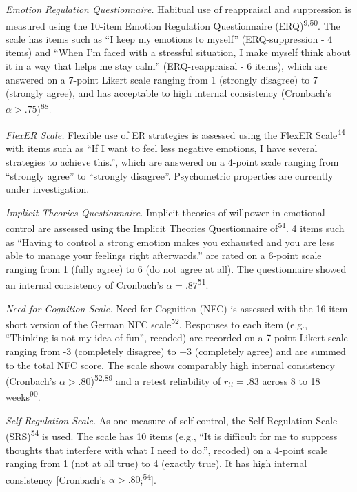 \documentclass[
  man,floatsintext]{apa6}
\begin{document}
\emph{Emotion Regulation Questionnaire.} Habitual use of reappraisal and suppression is measured using the 10-item Emotion Regulation Questionnaire (ERQ)\textsuperscript{9,50}.
The scale has items such as ``I keep my emotions to myself'' (ERQ-suppression - 4 items) and ``When I'm faced with a stressful situation, I make myself think about it in a way that helps me stay calm'' (ERQ-reappraisal - 6 items), which are answered on a 7-point Likert scale ranging from 1 (strongly disagree) to 7 (strongly agree), and has acceptable to high internal consistency (Cronbach's \(\alpha>.75\))\textsuperscript{88}.

\emph{FlexER Scale.} Flexible use of ER strategies is assessed using the FlexER Scale\textsuperscript{44} with items such as ``If I want to feel less negative emotions, I have several strategies to achieve this.'', which are answered on a 4-point scale ranging from ``strongly agree'' to ``strongly disagree''.
Psychometric properties are currently under investigation.

\emph{Implicit Theories Questionnaire.} Implicit theories of willpower in emotional control are assessed using the Implicit Theories Questionnaire of\textsuperscript{51}.
4 items such as ``Having to control a strong emotion makes you exhausted and you are less able to manage your feelings right afterwards.'' are rated on a 6-point scale ranging from 1 (fully agree) to 6 (do not agree at all).
The questionnaire showed an internal consistency of Cronbach's \(\alpha=.87\)\textsuperscript{51}.

\emph{Need for Cognition Scale.} Need for Cognition (NFC) is assessed with the 16-item short version of the German NFC scale\textsuperscript{52}. Responses to each item (e.g., ``Thinking is not my idea of fun'', recoded) are recorded on a 7-point Likert scale ranging from -3 (completely disagree) to +3 (completely agree) and are summed to the total NFC score. The scale shows comparably high internal consistency (Cronbach's \(\alpha>.80\))\textsuperscript{52,89} and a retest reliability of \(r_{tt}=.83\) across 8 to 18 weeks\textsuperscript{90}.

\emph{Self-Regulation Scale.} As one measure of self-control, the Self-Regulation Scale (SRS)\textsuperscript{54} is used. The scale has 10 items (e.g., ``It is difficult for me to suppress thoughts that interfere with what I need to do.'', recoded) on a 4-point scale ranging from 1 (not at all true) to 4 (exactly true). It has high internal consistency {[}Cronbach's \(\alpha>.80\);\textsuperscript{54}{]}.
\end{document}
